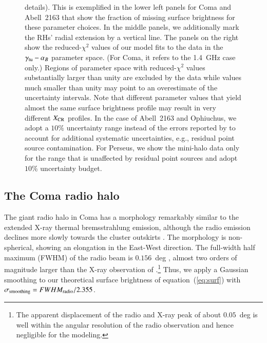 \documentclass[useAMS,usenatbib]{mn2e}
\def\del#1{{}}
\begin{document}
\begin{figure}
{  details). This is exemplified in the lower left panels for Coma and Abell~2163
  that show the fraction of missing surface brightness for these parameter
  choices. In the middle panels, we additionally mark the RHs' radial extension
  by a vertical line. The panels on the right show the reduced-$\chi^2$ values
  of our model fits to the data in the $\gamma_{{\mathrm{tu}}}-\alpha_{B}$ parameter
  space. (For Coma, it refers to the 1.4~GHz case only.)  Regions of parameter
  space with reduced-$\chi^2$ values substantially larger than unity are
  excluded by the data while values much smaller than unity may point to an
  overestimate of the uncertainty intervals. Note that different parameter
  values that yield almost the same surface brightness profile may result in
  very different $X_{{\mathrm{CR}}}$ profiles. In the case of Abell~2163 and
  Ophiuchus, we adopt a $10\%$ uncertainty range instead of the errors reported
  by \citet{2009A&A...499..679M} to account for additional systematic
  uncertainties, e.g., residual point source contamination. For Perseus, we show
  the mini-halo data only for the range that is unaffected by residual point
  sources \citep{1990MNRAS.246..477P} and adopt $10\%$ uncertainty budget.}
\label{fig:SBmodeling}
\end{figure}

\del{ We adopt a $10\%$ uncertainty range for the inner points of the Coma
  $352$~MHz data.}

\subsection{The Coma radio halo}

The giant radio halo in Coma has a morphology remarkably similar to the extended
X-ray thermal bremsstrahlung emission, although the radio emission declines more
slowly towards the cluster outskirts \citep{1992A&A...259L..31B,
  1997A&A...321...55D}. The morphology is non-spherical, showing an elongation
in the East-West direction.  The full-width half maximum (FWHM) of the radio
beam is $0.156$~deg \citep{1997A&A...321...55D}, almost two orders of magnitude
larger than the X-ray observation of \cite{1992A&A...259L..31B}.\footnote{The
  apparent displacement of the radio and X-ray peak of about $0.05$~deg is well
  within the angular resolution of the radio observation and hence negligible
  for the modeling.}  Thus, we apply a Gaussian smoothing to our theoretical
surface brightness of equation~(\ref{eq:surf}) with $\sigma_{{\mathrm{smoothing}}} =
FWHM_{{\mathrm{radio}}}/2.355$.
\end{document}
